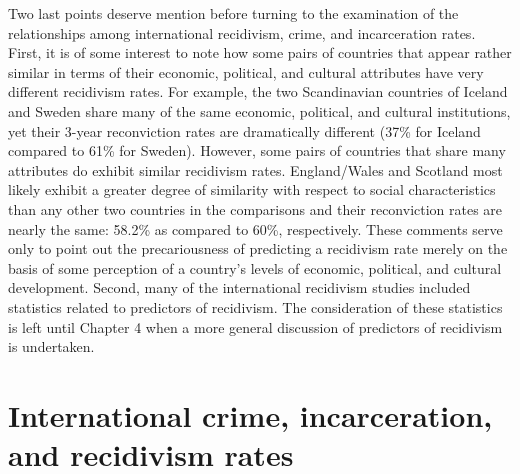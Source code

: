Two last points deserve mention before turning to the examination of the relationships among international recidivism, crime, and incarceration rates.  First, it is of some interest to note how some pairs of countries that appear rather similar in terms of their economic, political, and cultural attributes have very different recidivism rates.  For example, the two Scandinavian countries of Iceland and Sweden share many of the same economic, political, and cultural institutions, yet their 3-year reconviction rates are dramatically different (37\% for Iceland compared to 61\% for Sweden).  However, some pairs of countries that share many attributes do exhibit similar recidivism rates. England/Wales and Scotland most likely exhibit a greater degree of similarity with respect to social characteristics than any other two countries in the comparisons and their reconviction rates are nearly the same: 58.2\% as compared to 60\%, respectively.  These comments serve only to point out the precariousness of predicting a recidivism rate merely on the basis of some perception of a country's levels of economic, political, and cultural development.  Second, many of the international recidivism studies included statistics related to predictors of recidivism.  The consideration of these statistics is left until Chapter 4 when a more general discussion of predictors of recidivism is undertaken.




\section[International crime, incarceration, and recidivism rates]{International crime, incarceration,\\ and recidivism rates}

